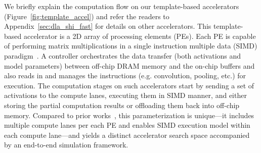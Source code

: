 %
We briefly explain the computation flow on our template-based accelerators (Figure~\ref{fig:template_accel}) and refer the readers to Appendix~\ref{sec:dla_shi_fast} for details on other accelerators. This template-based accelerator is a 2D array of processing elements (PEs). Each PE is capable of performing matrix multiplications in a single instruction multiple data (SIMD) paradigm~\citep{simd}. A controller orchestrates the data transfer (both activations and model parameters) between off-chip DRAM memory and the on-chip buffers and also reads in and manages the instructions (e.g. convolution, pooling, etc.) for execution. The computation stages on such accelerators start by sending a set of activations to the compute lanes, executing them in SIMD manner, and either storing the partial computation results or offloading them back into off-chip memory. Compared to prior works~\citep{hegdemind,shidiannao,kao2020confuciux}, this parameterization is unique---it includes multiple compute lanes per each PE and enables SIMD execution model within each compute lane---and yields a distinct accelerator search space accompanied by an end-to-end simulation framework. 
